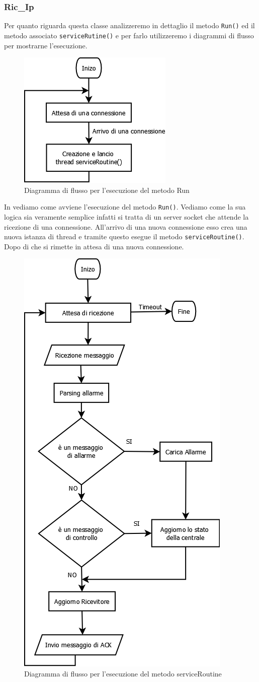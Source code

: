 \subsubsection{Ric\_Ip}
Per quanto riguarda questa classe analizzeremo in dettaglio il metodo \texttt{Run()} ed il metodo associato \texttt{serviceRutine()} e per farlo utilizzeremo i diagrammi di flusso per mostrarne l'esecuzione.
\begin{figure}
	\centering
	\includegraphics[width=0.5\linewidth]{pictures/runricip.png}
	\caption{Diagramma di flusso per l'esecuzione del metodo Run}\label{fig:riciprun}
\end{figure}
In  vediamo come avviene l'esecuzione del metodo \texttt{Run()}. Vediamo come la sua logica sia veramente semplice infatti si tratta di un server socket che attende la ricezione di una connessione. All'arrivo di una nuova connessione esso crea una nuova istanza di thread e tramite questo esegue il metodo \texttt{serviceRoutine()}. Dopo di che si rimette in attesa di una nuova connessione.
\begin{figure}
	\centering
	\includegraphics[width=0.5\linewidth]{pictures/servicericip.png}
	\caption{Diagramma di flusso per l'esecuzione del metodo serviceRoutine}\label{fig:servicericip}
\end{figure}
